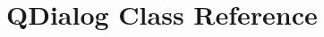 \hypertarget{classGUI_1_1Player_1_1QDialog}{}\section{Q\+Dialog Class Reference}
\label{classGUI_1_1Player_1_1QDialog}
